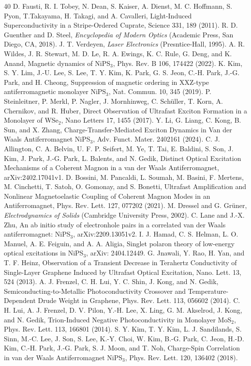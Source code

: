 \documentclass[%
 reprint,
superscriptaddress,
 amsmath,amssymb,
 aps,
]{revtex4-2}
\begin{document}
\begin{thebibliography}{40}
D. Fausti, R. I. Tobey, N. Dean, S. Kaiser, A. Dienst, M. C. Hoffmann, S. Pyon, T.Takayama, H. Takagi, and A. Cavalleri, Light-Induced Superconductivity in a Stripe-Ordered Cuprate, Science 331, 189 (2011).
R. D. Guenther and D. Steel, \textit{Encyclopedia of Modern Optics} (Academic Press, San Diego, CA, 2018).
J. T. Verdeyen, \textit{Laser Electronics} (Presntice-Hall, 1995).
A. R. Wildes, J. R. Stewart, M. D. Le, R. A. Ewings, K. C. Rule, G. Deng, and K. Anand, Magnetic dynamics of NiPS$_3$, Phys. Rev. B 106, 174422 (2022).
K. Kim, S. Y. Lim, J.-U. Lee, S. Lee, T. Y. Kim, K. Park,
G. S. Jeon, C.-H. Park, J.-G. Park, and H. Cheong, Suppression
of magnetic ordering in XXZ-type antiferromagnetic
monolayer NiPS$_3$, Nat. Commun. 10, 345 (2019).
P. Steinleitner, P. Merkl, P. Nagler, J. Mornhinweg,
C. Sch\"{u}ller, T. Korn, A. Chernikov, and R. Huber, Direct
Observation of Ultrafast Exciton Formation in a Monolayer
of WSe$_2$, Nano Letters 17, 1455 (2017).
Y. Li, G. Liang, C. Kong, B. Sun, and X. Zhang, Charge-Transfer-Mediated Exciton Dynamics in Van der Waals Antiferromagnet NiPS$_3$, Adv. Funct. Mater. 2402161
(2024).
C. J. Allington, C. A. Belvin, U. F. P. Seifert, M. Ye,
T. Tai, E. Baldini, S. Son, J. Kim, J. Park, J.-G. Park,
L. Balents, and N. Gedik, Distinct Optical Excitation
Mechanisms of a Coherent Magnon in a van der Waals
Antiferromagnet, arXiv:2402.17041v1.
D. Bossini, M. Pancaldi, L. Soumah, M. Basini,
F. Mertens, M. Cinchetti, T. Satoh, O. Gomonay, and
S. Bonetti, Ultrafast Amplification and Nonlinear Magnetoelastic
Coupling of Coherent Magnon Modes in an
Antiferromagnet, Phys. Rev. Lett. 127, 077202 (2021).
M. Dressel and G. Gr\"{u}ner, \textit{Electrodynamics of Solids}
(Cambridge University Press, 2002).
C. Lane and J.-X. Zhu, An ab initio study of electronhole
pairs in a correlated van der Waals antiferromagnet:
NiPS$_3$, arXiv:2209.13051v2.
I. J. Hamad, C. S. Helman, L. O. Manuel, A. E. Feiguin,
and A. A. Aligia, Singlet polaron theory of low-energy
optical excitations in NiPS$_3$, arXiv: 2404.12449.
G. Jnawali, Y. Rao, H. Yan, and T. F. Heinz, Observation
of a Transient Decrease in Terahertz Conductivity
of Single-Layer Graphene Induced by Ultrafast Optical
Excitation, Nano. Lett. 13, 524 (2013).
A. J. Frenzel, C. H. Lui, Y. C. Shin, J. Kong, and
N. Gedik, Semiconducting-to-Metallic Photoconductivity
Crossover and Temperature-Dependent Drude Weight in
Graphene, Phys. Rev. Lett. 113, 056602 (2014).
C. H. Lui, A. J. Frenzel, D. V. Pilon, Y.-H. Lee, X. Ling,
G. M. Akselrod, J. Kong, and N. Gedik, Trion-Induced
Negative Photoconductivity in Monolayer MoS$_2$, Phys.
Rev. Lett. 113, 166801 (2014).
S. Y. Kim, T. Y. Kim, L. J. Sandilands, S. Sinn, M.-C.
Lee, J. Son, S. Lee, K.-Y. Choi, W. Kim, B.-G. Park,
C. Jeon, H.-D. Kim, C.-H. Park, J.-G. Park, S. J. Moon,
and T. Noh, Charge-Spin Correlation in van der Waals
Antiferromagnet NiPS$_3$, Phys. Rev. Lett. 120, 136402
(2018).
\end{thebibliography}
\end{document}
